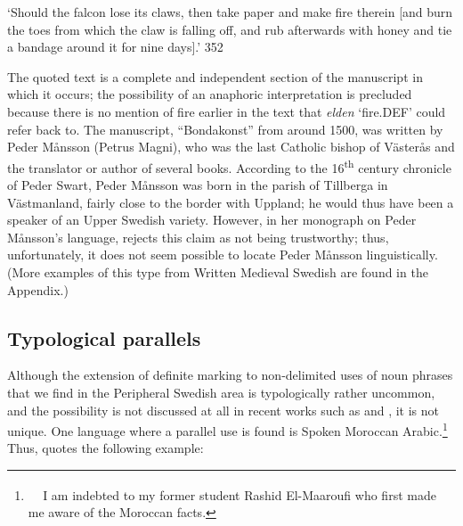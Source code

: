 \begin{styleBlockQuote}

\end{styleBlockQuote}

\begin{styleTranslation}
‘Should the falcon lose its claws, then take paper and make fire therein [and burn the toes from which the claw is falling off, and rub afterwards with honey and tie a bandage around it for nine days].’ 352

\end{styleTranslation}

\begin{styleBodyTextFirst}
The quoted text is a complete and independent section of the manuscript in which it occurs; the possibility of an anaphoric interpretation is precluded because there is no mention of fire earlier in the text that \textit{elden} ‘fire.DEF’ could refer back to. The manuscript, “Bondakonst” from around 1500, was written by Peder Månsson (Petrus Magni), who was the last Catholic bishop of Västerås and the translator or author of several books. According to the 16\textsuperscript{th} century chronicle of Peder Swart, Peder Månsson was born in the parish of Tillberga in Västmanland, fairly close to the border with Uppland; he would thus have been a speaker of an Upper Swedish variety. However, in her monograph on Peder Månsson’s language, \citet[51]{Nordling2001} rejects this claim as not being trustworthy; thus, unfortunately, it does not seem possible to locate Peder Månsson linguistically. (More examples of this type from Written Medieval Swedish are found in the Appendix.) 

\end{styleBodyTextFirst}

\subsection{\rmfamily Typological parallels}
\label{bkm:Ref134937864}
\begin{styleBodyTextFirst}
Although the extension of definite marking to non-delimited uses of noun phrases that we find in the Peripheral Swedish area is typologically rather uncommon, and the possibility is not discussed at all in recent works such as \citet{Himmelmann1997} and \citet{Lyons1999}, it is not unique. One language where a parallel use is found is Spoken Moroccan Arabic.\footnote{\textsuperscript{\ \ } I am indebted to my former student Rashid El-Maaroufi who first made me aware of the Moroccan facts. } Thus, \citet[235]{Caubet1983} quotes the following example:

\end{styleBodyTextFirst}

